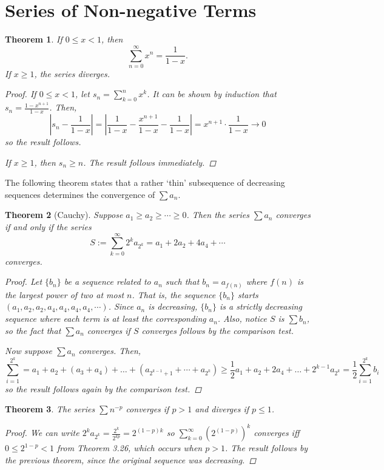 \documentclass{scrbook}
\renewcommand{\to}{\rightarrow}
\newtheorem{theorem}{Theorem}
\begin{document}
\section{Series of Non-negative Terms}

\begin{theorem} %
If $0 \le x < 1$, then
\[
	\sum_{n=0}^{\infty} x^n = \frac{1}{1 - x}.
\]
If $x \ge 1$, the series diverges.

\begin{proof}
If $0 \le x < 1$, let $s_n = \sum_{k=0}^{n} x^k$. It can be shown by induction that $s_n = \frac{1 - x^{n+1}}{1 - x}$. Then,
\[
	\left|s_n - \frac{1}{1 - x}\right| = \left| \frac{1}{1 - x} - \frac{x^{n+1}}{1 - x} - \frac{1}{1 - x}\right| = x^{n + 1} \cdot \frac{1}{1 - x} \to 0
\]
so the result follows.

If $x \ge 1$, then $s_n \ge n$. The result follows immediately.
\end{proof}
\end{theorem}

The following theorem states that a rather `thin' subsequence of decreasing sequences determines the convergence of $\sum a_n$.
\begin{theorem}[Cauchy] %
Suppose $a_1 \ge a_2 \ge \dotsb \ge 0$. Then the series $\sum a_n$ converges if and only if the series
\[
	S := \sum_{k=0}^{\infty} 2^k a_{2^k} = a_1 + 2a_2 + 4a_4 + \dotsb
\]
converges.

\begin{proof}
Let $\{b_n\}$ be a sequence related to $a_n$ such that $b_n = a_{f(n)}$ where $f(n)$ is the largest power of two at most $n$. That is, the sequence $\{b_n\}$ starts $(a_1, a_2, a_2, a_4, a_4, a_4, a_4, \dotsb)$. Since $a_n$ is decreasing, $\{b_n\}$ is a strictly decreasing sequence where each term is at least the corresponding $a_n$. Also, notice $S$ is $\sum b_n$, so the fact that $\sum a_n$ converges if $S$ converges follows by the comparison test.

Now suppose $\sum a_n$ converges. Then, 
\[
	\sum_{i=1}^{2^k} = a_1 + a_2 + (a_3 + a_4) + \dotsc + (a_{2^{k-1}+1} + \dotsb + a_{2^k}) \ge \frac{1}{2} a_1 + a_2 + 2a_4 + \dotsc + 2^{k-1} a_{2^k} = \frac{1}{2} \sum_{i=1}^{2^k} b_i
\]
so the result follows again by the comparison test.
\end{proof}
\end{theorem}

\begin{theorem} %
The series $\sum n^{-p}$ converges if $p > 1$ and diverges if $p \le 1$. 

\begin{proof}
We can write $2^k a_{2^k} = \frac{2^k}{2^{kp}} = 2^{(1-p)k}$ so $\sum_{k=0}^{\infty} (2^{(1-p)})^k$ converges iff $0 \le 2^{1-p} < 1$ from Theorem 3.26, which occurs when $p > 1$. The result follows by the previous theorem, since the original sequence was decreasing.
\end{proof}
\end{theorem}
\end{document}
